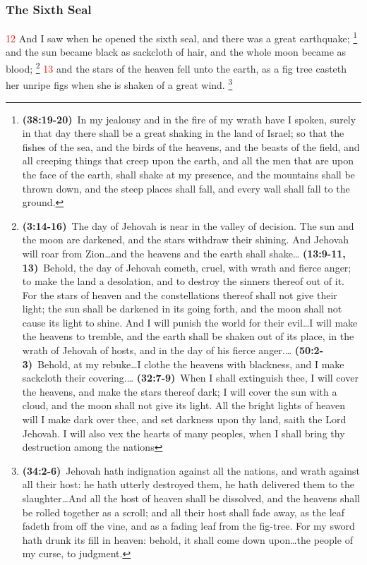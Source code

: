 \documentclass[12pt,twoside]{memoir}
\newcommand{\cbibleref}[3]{\textbf{\ibibleverse{#1}(#2)}\ {#3}}
\newcommand{\cbiblechvs}[3]{\textbf{\ibiblechvs{#1}(#2)}\ {#3}}
\newcommand{\cbiblefoot}[3]{\footnote{\cbibleref{#1}{#2}{#3}}}
\newcommand{\vnum}[1]{\textcolor{red}{\normalsize{#1}}}
\begin{document}
\subsubsection*{The Sixth Seal}
\vnum{12} And I saw when he opened the sixth seal, and there was a great earthquake;%
	\cbiblefoot{Ezekiel}{38:19-20}{In my jealousy and in the fire of my wrath have I spoken, surely in that day there shall be a great shaking in the land of Israel; so that the fishes of the sea, and the birds of the heavens, and the beasts of the field, and all creeping things that creep upon the earth, and all the men that are upon the face of the earth, shall shake at my presence, and the mountains shall be thrown down, and the steep places shall fall, and every wall shall fall to the ground.}
 and the sun became black as sackcloth of hair, and the whole moon became as blood;
 	\footnote{
 		\cbibleref{Joel}{3:14-16}{The day of Jehovah is near in the valley of decision. The sun and the moon are darkened, and the stars withdraw their shining. And Jehovah will roar from Zion\ldots and the heavens and the earth shall shake}\ldots%
 		\cbibleref{Isaiah}{13:9-11, 13}{Behold, the day of Jehovah cometh, cruel, with wrath and fierce anger; to make the land a desolation, and to destroy the sinners thereof out of it. For the stars of heaven and the constellations thereof shall not give their light; the sun shall be darkened in its going forth, and the moon shall not cause its light to shine. And I will punish the world for their evil\ldots I will make the heavens to tremble, and the earth shall be shaken out of its place, in the wrath of Jehovah of hosts, and in the day of his fierce anger.}\ldots%
 		\cbiblechvs{Isaiah}{50:2-3}{Behold, at my rebuke\ldots I clothe the heavens with blackness, and I make sackcloth their covering.}\ldots%
 		\cbibleref{Ezekiel}{32:7-9}{When I shall extinguish thee, I will cover the heavens, and make the stars thereof dark; I will cover the sun with a cloud, and the moon shall not give its light. All the bright lights of heaven will I make dark over thee, and set darkness upon thy land, saith the Lord Jehovah. I will also vex the hearts of many peoples, when I shall bring thy destruction among the nations}%
 	} %
\vnum{13} and the stars of the heaven fell unto the earth, as a fig tree casteth her unripe figs when she is shaken of a great wind.
	\cbiblefoot{Isaiah}{34:2-6}{Jehovah hath indignation against all the nations, and wrath against all their host: he hath utterly destroyed them, he hath delivered them to the slaughter\ldots And all the host of heaven shall be dissolved, and the heavens shall be rolled together as a scroll; and all their host shall fade away, as the leaf fadeth from off the vine, and as a fading leaf from the fig-tree. For my sword hath drunk its fill in heaven: behold, it shall come down upon\ldots the people of my curse, to judgment.} %
\end{document}
